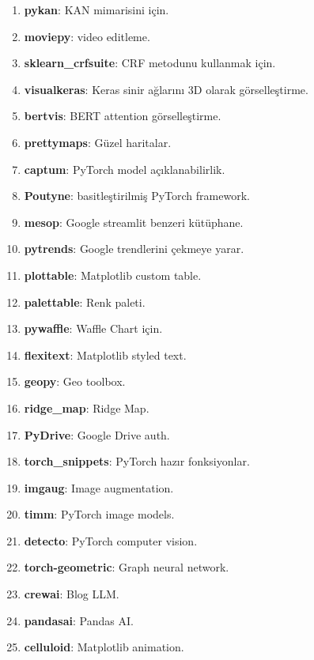 \begin{enumerate}
    \item \textbf{pykan}: KAN mimarisini için.
    \item \textbf{moviepy}: video editleme.
    \item \textbf{sklearn\_crfsuite}: CRF metodunu kullanmak için.
    \item \textbf{visualkeras}: Keras sinir ağlarını 3D olarak görselleştirme.
    \item \textbf{bertvis}: BERT attention görselleştirme.
    \item \textbf{prettymaps}: Güzel haritalar.
    \item \textbf{captum}: PyTorch model açıklanabilirlik.
    \item \textbf{Poutyne}: basitleştirilmiş PyTorch framework.
    \item \textbf{mesop}: Google streamlit benzeri kütüphane.
    \item \textbf{pytrends}: Google trendlerini çekmeye yarar.
    \item \textbf{plottable}: Matplotlib custom table.
    \item \textbf{palettable}: Renk paleti.
    \item \textbf{pywaffle}: Waffle Chart için.
    \item \textbf{flexitext}: Matplotlib styled text.
    \item \textbf{geopy}: Geo toolbox.
    \item \textbf{ridge\_map}: Ridge Map.
    \item \textbf{PyDrive}: Google Drive auth.
    \item \textbf{torch\_snippets}: PyTorch hazır fonksiyonlar.
    \item \textbf{imgaug}: Image augmentation.
    \item \textbf{timm}: PyTorch image models.
    \item \textbf{detecto}: PyTorch computer vision.
    \item \textbf{torch-geometric}: Graph neural network.
    \item \textbf{crewai}: Blog LLM.
    \item \textbf{pandasai}: Pandas AI.
    \item \textbf{celluloid}: Matplotlib animation.
\end{enumerate}

\newpage

